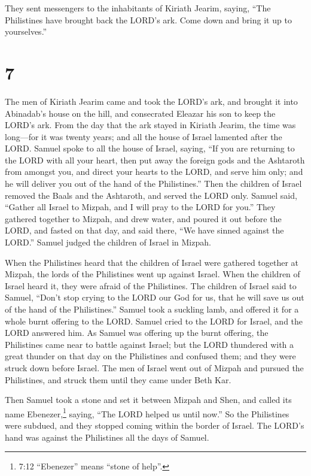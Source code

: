  They sent messengers to the inhabitants of Kiriath Jearim,
saying, ``The Philistines have brought back the LORD's ark. Come down
and bring it up to yourselves.''

\hypertarget{section-6}{%
\section{7}\label{section-6}}

 The men of Kiriath Jearim came and took the LORD's ark, and
brought it into Abinadab's house on the hill, and consecrated Eleazar
his son to keep the LORD's ark.  From the day that the ark
stayed in Kiriath Jearim, the time was long---for it was twenty years;
and all the house of Israel lamented after the LORD.  Samuel
spoke to all the house of Israel, saying, ``If you are returning to the
LORD with all your heart, then put away the foreign gods and the
Ashtaroth from amongst you, and direct your hearts to the LORD, and
serve him only; and he will deliver you out of the hand of the
Philistines.''  Then the children of Israel removed the
Baals and the Ashtaroth, and served the LORD only.  Samuel
said, ``Gather all Israel to Mizpah, and I will pray to the LORD for
you.''  They gathered together to Mizpah, and drew water,
and poured it out before the LORD, and fasted on that day, and said
there, ``We have sinned against the LORD.'' Samuel judged the children
of Israel in Mizpah.

 When the Philistines heard that the children of Israel were
gathered together at Mizpah, the lords of the Philistines went up
against Israel. When the children of Israel heard it, they were afraid
of the Philistines.  The children of Israel said to Samuel,
``Don't stop crying to the LORD our God for us, that he will save us out
of the hand of the Philistines.''  Samuel took a suckling
lamb, and offered it for a whole burnt offering to the LORD. Samuel
cried to the LORD for Israel, and the LORD answered him. 
As Samuel was offering up the burnt offering, the Philistines came near
to battle against Israel; but the LORD thundered with a great thunder on
that day on the Philistines and confused them; and they were struck down
before Israel.  The men of Israel went out of Mizpah and
pursued the Philistines, and struck them until they came under Beth Kar.

 Then Samuel took a stone and set it between Mizpah and
Shen, and called its name Ebenezer,\footnote{7:12 ``Ebenezer'' means
  ``stone of help''.} saying, ``The LORD helped us until now.''
 So the Philistines were subdued, and they stopped coming
within the border of Israel. The LORD's hand was against the Philistines
all the days of Samuel.

